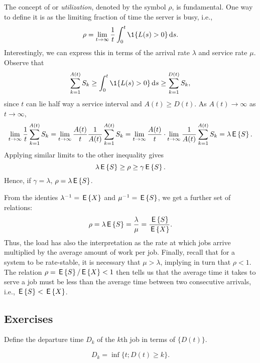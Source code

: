 The concept of  or \emph{utilization}, denoted by the
symbol $\rho$, is fundamental. One way to define it is as the limiting
fraction of time the server is busy, i.e.,
\begin{equation*}
  \rho = \lim_{t\to\infty} \frac 1 t \int_0^t \1{L(s)>0} \d s.
\end{equation*}
Interestingly, we can express this in terms of the arrival rate
$\lambda$ and service rate $\mu$. Observe that
\begin{equation*}
  \sum_{k=1}^{A(t)} S_k \geq \int_0^t \1{L(s)>0} \d s \geq   \sum_{k=1}^{D(t)} S_k,
\end{equation*}
since $t$ can lie half way a service interval and $A(t) \geq D(t)$. As
$A(t)\to \infty$ as $t\to\infty$,
\begin{equation*}
  \lim_{t\to\infty} \frac 1 t\sum_{k=1}^{A(t)} S_k = 
  \lim_{t\to\infty} \frac{A(t)}t \frac{1}{A(t)} \sum_{k=1}^{A(t)} S_k = 
  \lim_{t\to\infty} \frac{A(t)}t \cdot \lim_{t\to\infty}\frac{1}{A(t)} \sum_{k=1}^{A(t)} S_k = \lambda \,\mathsf{E}\left\{S\right\}.
\end{equation*}
Applying similar limits to the other inequality gives
\begin{equation*}
\lambda \,\mathsf{E}\left\{S\right\} \geq \rho \geq \gamma \,\mathsf{E}\left\{S\right\}.
\end{equation*}
Hence, if $\gamma=\lambda$, $\rho = \lambda \,\mathsf{E}\left\{S\right\}$.  

From the identies $\lambda^{-1} = \,\mathsf{E}\left\{X\right\}$ and $\mu^{-1} = \,\mathsf{E}\left\{S\right\}$, we get
a further set of relations:
\begin{equation*}
  \rho = \lambda \,\mathsf{E}\left\{S\right\} = \frac{\lambda}{\mu} = \frac{\,\mathsf{E}\left\{S\right\}}{\,\mathsf{E}\left\{X\right\}}.
\end{equation*}
Thus, the load has also the interpretation as the rate at which jobs
arrive multiplied by the average amount of work per job.  Finally,
recall that for a system to be rate-stable, it is necessary that
$\mu> \lambda$, implying in turn that $\rho < 1$. The relation
$\rho=\,\mathsf{E}\left\{S\right\}/ \,\mathsf{E}\left\{X\right\} < 1$ then tells us that the average time it takes to
serve a job must be less than the average time between two consecutive
arrivals, i.e., $\,\mathsf{E}\left\{S\right\} < \,\mathsf{E}\left\{X\right\}$.

\subsection*{Exercises}
\label{sec:exercises}



\begin{question}
  Define the departure time $D_{k}$ of the $k$th job in terms of
  $\{D(t)\}$. 
  \begin{hint}
    
  \end{hint}
\begin{solution}
  \begin{equation*}
 D_{k} = \inf\{t; D(t) \geq k\}.
  \end{equation*}
\end{solution}
\end{question}

